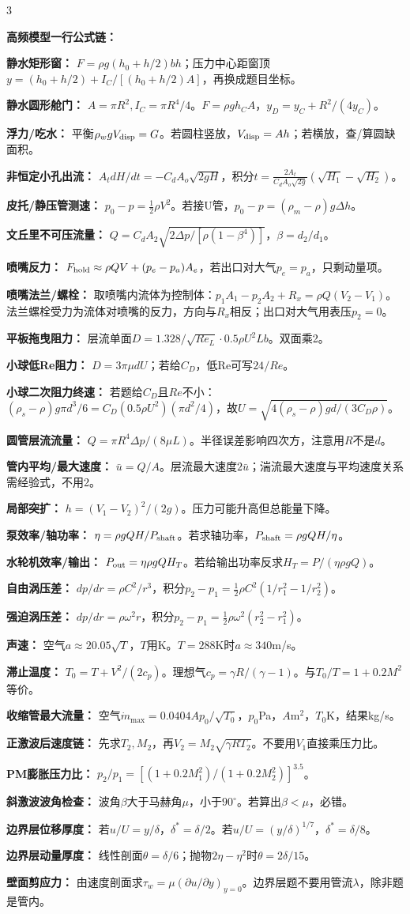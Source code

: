 \documentclass[a4paper]{article}
\newcommand{\sect}[1]{\par{\bfseries\color{Q}#1：}}
\begin{document}
\begin{multicols}{3}
{\sect{高频模型一行公式链}
\sect{静水矩形窗}
$F=\rho g(h_0+h/2)bh$；压力中心距窗顶$y=(h_0+h/2)+I_C/[(h_0+h/2)A]$，再换成题目坐标。
\sect{静水圆形舱门}
$A=\pi R^2,I_C=\pi R^4/4$。$F=\rho gh_CA$，$y_D=y_C+R^2/(4y_C)$。
\sect{浮力/吃水}
平衡$\rho_w gV_{\rm disp}=G$。若圆柱竖放，$V_{\rm disp}=Ah$；若横放，查/算圆缺面积。
\sect{非恒定小孔出流}
$A_t dH/dt=-C_dA_o\sqrt{2gH}$，积分$t=\frac{2A_t}{C_dA_o\sqrt{2g}}(\sqrt{H_1}-\sqrt{H_2})$。
\sect{皮托/静压管测速}
$p_0-p=\frac12\rho V^2$。若接U管，$p_0-p=(\rho_m-\rho)g\Delta h$。
\sect{文丘里不可压流量}
$Q=C_dA_2\sqrt{2\Delta p/[\rho(1-\beta^4)]}$，$\beta=d_2/d_1$。
\sect{喷嘴反力}
$F_{\rm hold}\approx\rho QV+(p_e-p_a)A_e$，若出口对大气$p_e=p_a$，只剩动量项。
\sect{喷嘴法兰/螺栓}
取喷嘴内流体为控制体：$p_1A_1-p_2A_2+R_x=\rho Q(V_2-V_1)$。法兰螺栓受力为流体对喷嘴的反力，方向与$R_x$相反；出口对大气用表压$p_2=0$。
\sect{平板拖曳阻力}
层流单面$D=1.328/\sqrt{Re_L}\cdot0.5\rho U^2Lb$。双面乘2。
\sect{小球低Re阻力}
$D=3\pi\mu dU$；若给$C_D$，低Re可写$24/Re$。
\sect{小球二次阻力终速}
若题给$C_D$且$Re$不小：$(\rho_s-\rho)g\pi d^3/6=C_D(0.5\rho U^2)(\pi d^2/4)$，故$U=\sqrt{4(\rho_s-\rho)gd/(3C_D\rho)}$。
\sect{圆管层流流量}
$Q=\pi R^4\Delta p/(8\mu L)$。半径误差影响四次方，注意用$R$不是$d$。
\sect{管内平均/最大速度}
$\bar u=Q/A$。层流最大速度$2\bar u$；湍流最大速度与平均速度关系需经验式，不用2。
\sect{局部突扩}
$h=(V_1-V_2)^2/(2g)$。压力可能升高但总能量下降。
\sect{泵效率/轴功率}
$\eta=\rho gQH/P_{\rm shaft}$。若求轴功率，$P_{\rm shaft}=\rho gQH/\eta$。
\sect{水轮机效率/输出}
$P_{\rm out}=\eta\rho gQH_T$。若给输出功率反求$H_T=P/(\eta\rho gQ)$。
\sect{自由涡压差}
$dp/dr=\rho C^2/r^3$，积分$p_2-p_1=\frac12\rho C^2(1/r_1^2-1/r_2^2)$。
\sect{强迫涡压差}
$dp/dr=\rho\omega^2r$，积分$p_2-p_1=\frac12\rho\omega^2(r_2^2-r_1^2)$。
\sect{声速}
空气$a\approx20.05\sqrt{T}$，$T$用K。$T=288$K时$a\approx340$m/s。
\sect{滞止温度}
$T_0=T+V^2/(2c_p)$。理想气$c_p=\gamma R/(\gamma-1)$。与$T_0/T=1+0.2M^2$等价。
\sect{收缩管最大流量}
空气$\dot m_{\max}=0.0404A p_0/\sqrt{T_0}$，$p_0$Pa，$A$m$^2$，$T_0$K，结果kg/s。
\sect{正激波后速度链}
先求$T_2,M_2$，再$V_2=M_2\sqrt{\gamma RT_2}$。不要用$V_1$直接乘压力比。
\sect{PM膨胀压力比}
$p_2/p_1=[(1+0.2M_1^2)/(1+0.2M_2^2)]^{3.5}$。
\sect{斜激波波角检查}
波角$\beta$大于马赫角$\mu$，小于$90^\circ$。若算出$\beta<\mu$，必错。
\sect{边界层位移厚度}
若$u/U=y/\delta$，$\delta^*=\delta/2$。若$u/U=(y/\delta)^{1/7}$，$\delta^*=\delta/8$。
\sect{边界层动量厚度}
线性剖面$\theta=\delta/6$；抛物$2\eta-\eta^2$时$\theta=2\delta/15$。
\sect{壁面剪应力}
由速度剖面求$\tau_w=\mu(\partial u/\partial y)_{y=0}$。边界层题不要用管流$\lambda$，除非题是管内。
}
\end{multicols}
\end{document}
